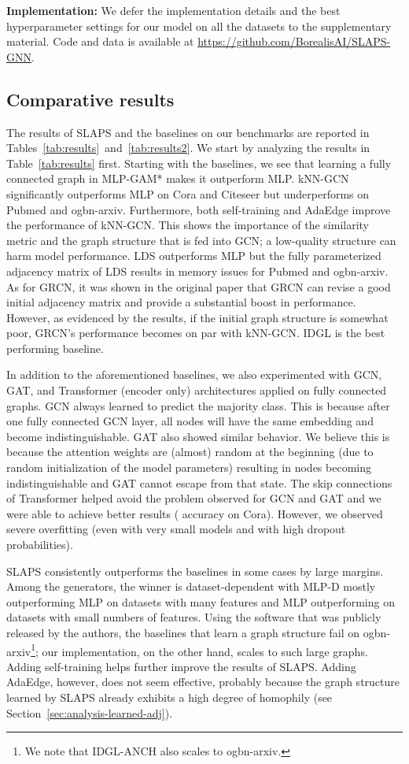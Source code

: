 \documentclass{article}
\begin{document}
\textbf{Implementation:} We defer the implementation details and the best hyperparameter settings for our model on all the datasets to the supplementary material. Code and data is available at \href{https://github.com/BorealisAI/SLAPS-GNN}{https://github.com/BorealisAI/SLAPS-GNN}.


\subsection{Comparative results} 
The results of SLAPS and the baselines on our benchmarks are reported in Tables~\ref{tab:results}~and~\ref{tab:results2}. We start by analyzing the results in Table~\ref{tab:results} first. Starting with the baselines, we see that learning a fully connected graph in MLP-GAM* makes it outperform MLP.
kNN-GCN significantly outperforms MLP on Cora and Citeseer but underperforms on Pubmed and ogbn-arxiv. Furthermore, both self-training and AdaEdge improve the performance of kNN-GCN. This shows the importance of the similarity metric and the graph structure that is fed into GCN; a low-quality structure can harm model performance. LDS outperforms MLP but the fully parameterized adjacency matrix of LDS results in memory issues for Pubmed and ogbn-arxiv. As for GRCN, it was shown in the original paper that GRCN can revise a good initial adjacency matrix and provide a substantial boost in performance. However, as evidenced by the results, if the initial graph structure is somewhat poor, GRCN's performance becomes on par with kNN-GCN. IDGL is the best performing baseline. 

In addition to the aforementioned baselines, we also experimented with GCN, GAT, and Transformer (encoder only) architectures applied on fully connected graphs. GCN always learned to predict the majority class. This is because after one fully connected GCN layer, all nodes will have the same embedding and become indistinguishable. GAT also showed similar behavior. We believe this is because the attention weights are (almost) random at the beginning (due to random initialization of the model parameters) resulting in nodes becoming indistinguishable and GAT cannot escape from that state. The skip connections of Transformer helped avoid the problem observed for GCN and GAT and we were able to achieve better results ( accuracy on Cora). However, we observed severe overfitting (even with very small models and with high dropout probabilities).

SLAPS consistently outperforms the baselines in some cases by large margins. Among the generators, the winner is dataset-dependent with MLP-D mostly outperforming MLP on datasets with many features and MLP outperforming on datasets with small numbers of features. Using the software that was publicly released by the authors, the baselines that learn a graph structure fail on ogbn-arxiv\footnote{We note that IDGL-ANCH also scales to ogbn-arxiv.}; our implementation, on the other hand, scales to such large graphs. Adding self-training helps further improve the results of SLAPS. Adding AdaEdge, however, does not seem effective, probably because the graph structure learned by SLAPS already exhibits a high degree of homophily (see Section~\ref{sec:analysis-learned-adj}). 
\end{document}
